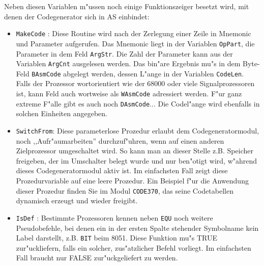 \documentclass[12pt,a4paper,twoside]{report}
\newcommand{\tty}[1]{{\tt #1}}
\begin{document}
{Neben diesen Variablen m"ussen noch einige Funktionszeiger besetzt wird,
mit denen der Codegenerator sich in AS einbindet:
\begin{itemize}
\item{\tty{MakeCode} : Diese Routine wird nach der Zerlegung einer Zeile
      in Mnemonic und Parameter aufgerufen.  Das Mnemonic liegt in der
      Variablen \tty{OpPart}, die Parameter in dem Feld \tty{ArgStr}.
      Die Zahl der Parameter kann aus der Variablen \tty{ArgCnt} ausgelesen
      werden.  Das bin"are Ergebnis mu"s in dem Byte-Feld \tty{BAsmCode}
      abgelegt werden, dessen L"ange in der Variablen \tty{CodeLen}.  Falls
      der Prozessor wortorientiert wie der 68000 oder viele Signalprozessoren
      ist, kann Feld auch wortweise als \tty{WAsmCode} adressiert werden.
      F"ur ganz extreme F"alle gibt es auch noch \tty{DAsmCode}... Die
      Codel"ange wird ebenfalls in solchen Einheiten angegeben.}
\item{\tty{SwitchFrom}: Diese parameterlose Prozedur erlaubt dem
      Codegeneratormodul, noch ,,Aufr"aumarbeiten'' durchzuf"uhren,
      wenn auf einen anderen Zielprozessor umgeschaltet wird.  So
      kann man an dieser Stelle z.B. Speicher freigeben, der im
      Umschalter belegt wurde und nur ben"otigt wird, w"ahrend dieses
      Codegeneratormodul aktiv ist.  Im einfachsten Fall zeigt diese
      Prozedurvariable auf eine leere Prozedur.  Ein Beispiel f"ur die
      Anwendung dieser Prozedur finden Sie im Modul \tty{CODE370}, das
      seine Codetabellen dynamisch erzeugt und wieder freigibt.}
\item{\tty{IsDef} : Bestimmte Prozessoren kennen neben \tty{EQU} noch weitere
      Pseudobefehle, bei denen ein in der ersten Spalte stehender
      Symbolname kein Label darstellt, z.B. \tty{BIT} beim 8051.  Diese
      Funktion mu"s TRUE zur"uckliefern, falls ein solcher, zus"atzlicher
      Befehl vorliegt.  Im einfachsten Fall braucht nur FALSE
      zur"uckgeliefert zu werden.}
\end{itemize}

}
\end{document}
